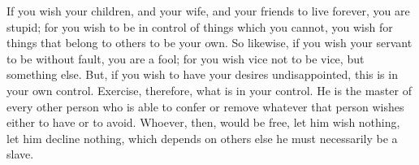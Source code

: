 If you wish your children, and your wife, and your friends to live forever, you
are stupid; for you wish to be in  control of things which you cannot, you wish
for things that belong to others to be  your own. So likewise, if you wish your
servant to be without fault, you are a  fool; for you wish vice not to be vice,
but something else. But, if you  wish to have your desires undisappointed, this
is in your own control. Exercise, therefore, what is in your control. He is the
master of  every other  person who is  able to confer  or remove  whatever that
person wishes either to have or to avoid. Whoever, then, would be free, let him
wish nothing,  let him decline  nothing, which depends  on others else  he must
necessarily be a slave.
